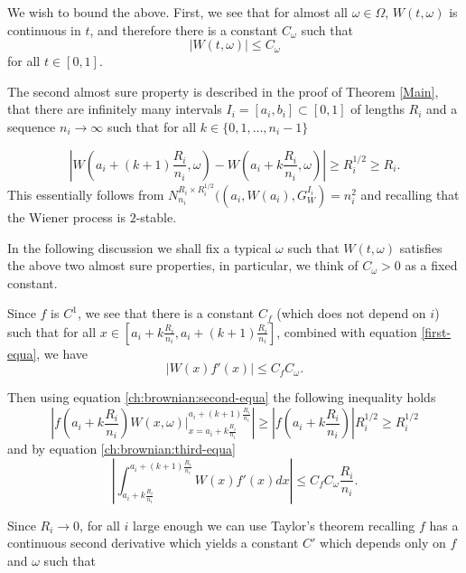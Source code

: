 	We wish to bound the above. First, we see that for almost all $\omega\in\Omega$, $W(t,\omega)$ is continuous in $t$, and therefore there is a constant $C_\omega$ such that
	\begin{equation}
	    |W(t,\omega)|\leq C_\omega \label{first-equa}
	\end{equation}
	for all $t\in [0,1]$. 
	
	The second almost sure property is described in the proof of Theorem \ref{Main}, that there are infinitely many intervals $I_i=[a_i,b_i]\subset [0,1]$ of lengths $R_i$ and a sequence $n_i\to\infty$ such that for all $k\in\{0,1,\dots,n_i-1\}$
	
	\begin{equation}
	    \left|W\left(a_i+(k+1)\frac{R_i}{n_i},\omega\right)-W\left(a_i+k\frac{R_i}{n_i},\omega\right)\right|\geq R_i^{1/2}\geq R_i. \label{ch:brownian:second-equa}
	\end{equation}
	This essentially follows from $N_{n_i}^{R_i \times R_i^{1/2}}((a_i,W(a_i), G_W^{I_i})  = n_i^2$ and recalling that the Wiener process is $2$-stable.
	
	In the following discussion we shall fix a typical $\omega$ such that $W(t,\omega)$ satisfies the above two almost sure properties, in particular, we think of $C_\omega>0$ as a fixed constant. 
	
	Since $f$ is $C^1$, we see that there is a constant $C_f$ (which does not depend on $i$) such that for all $x\in \left[{a_i+k\frac{R_i}{n_i}},{a_i+(k+1)\frac{R_i}{n_i}}\right]$, combined with equation \eqref{first-equa}, we have
	\begin{equation}
	\lvert W(x)f'(x)\rvert \leq C_f C_\omega. \label{ch:brownian:third-equa}
	\end{equation}
	
	Then using equation \eqref{ch:brownian:second-equa} the following inequality holds
	\begin{equation}
	\left| f\left(a_i+k\frac{R_i}{n_i}\right)W(x,\omega)\bigg\vert_{x=a_i+k\frac{R_i}{n_i}}^{a_i+(k+1)\frac{R_i}{n_i}} \right| \geq \left| f\left(a_i+k\frac{R_i}{n_i}\right) \right| R_i^{1/2}\geq R_i^{1/2}\label{ch:brownian:ineq-one}    
	\end{equation}
	and by equation \eqref{ch:brownian:third-equa}
	\[
	\left\vert\int_{a_i+k\frac{R_i}{n_i}}^{a_i+(k+1)\frac{R_i}{n_i}} W(x)f'(x)dx \right\vert\leq C_fC_\omega\frac{R_i}{n_i}.
	\]
	
	Since $R_i\to 0$, for all $i$ large enough we can use Taylor's theorem recalling $f$ has a continuous second derivative which yields a constant $C'$ which depends only on $f$ and $\omega$ such that
	
